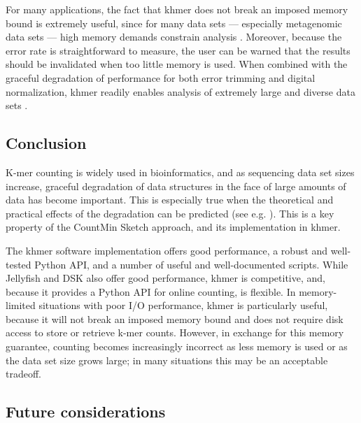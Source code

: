 \documentclass[10pt]{article}
\begin{document}
For many applications, the fact that khmer does not break an imposed
memory bound is extremely useful, since for many data sets ---
especially metagenomic data sets --- high memory demands constrain analysis 
\cite{Howe2012,Luo2009}.  Moreover, because the error
rate is straightforward to measure, the user can be warned that the
results should be invalidated when too little memory is used.  When combined
with the graceful degradation of performance for both error trimming
and digital normalization, khmer readily enables analysis of extremely
large and diverse data sets \cite{adina2013}.

\subsection*{Conclusion}

K-mer counting is widely used in bioinformatics, and as sequencing data set sizes
increase, graceful degradation of data structures in the face of large
amounts of data has become important.  This is especially true when
the theoretical and practical effects of the degradation can be
predicted (see e.g. \cite{Melsted2011, Pell2012, Roy2013}).  This
is a key property of the CountMin Sketch
approach, and its implementation in khmer.

The khmer software implementation offers good performance, a robust
and well-tested Python API, and a number of useful and well-documented
scripts.  While Jellyfish and DSK also offer good performance,
khmer is competitive, and, because it provides a
Python API for online counting, is flexible.  In memory-limited
situations with poor I/O performance, khmer is particularly useful,
because it will not break an imposed memory bound and does not require
disk access to store or retrieve k-mer counts.  However, in exchange
for this memory guarantee, counting becomes increasingly incorrect as
less memory is used or as the data set size grows large; in many
situations this may be an acceptable tradeoff.

\subsection*{Future considerations}
\end{document}

